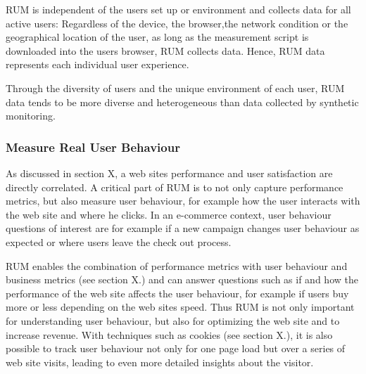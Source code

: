 
RUM is independent of the users set up or environment and collects data for all active users:
Regardless of the device, the browser,the network condition or the geographical location of the user, as long as the measurement script is downloaded into the users browser, RUM collects data.%
Hence, RUM data represents each individual user experience. %

Through the diversity of users and the unique environment of each user,  RUM data tends to be more diverse and heterogeneous than data collected by synthetic monitoring. %



\subsubsection{Measure Real User Behaviour}



As discussed in section X, a web sites performance and user satisfaction are directly correlated.
A critical part of RUM is to not only capture performance metrics, but also measure user behaviour, for example how the user interacts with the web site and where he clicks. %
In an e-commerce context, user behaviour questions of interest are for example if a new campaign changes user behaviour as expected or where users leave the check out process. %

RUM enables the combination of performance metrics with user behaviour and business metrics (see section X.) and can answer questions such as if and how the performance of the web site affects the user behaviour, for example if users buy more or less depending on the web sites speed.%
Thus RUM is not only important for understanding user behaviour, but also for optimizing the web site and to increase revenue.
With techniques such as cookies (see section X.), it is also possible to track user behaviour not only for one page load but over a series of web site visits, leading to even more detailed insights about the visitor. %


